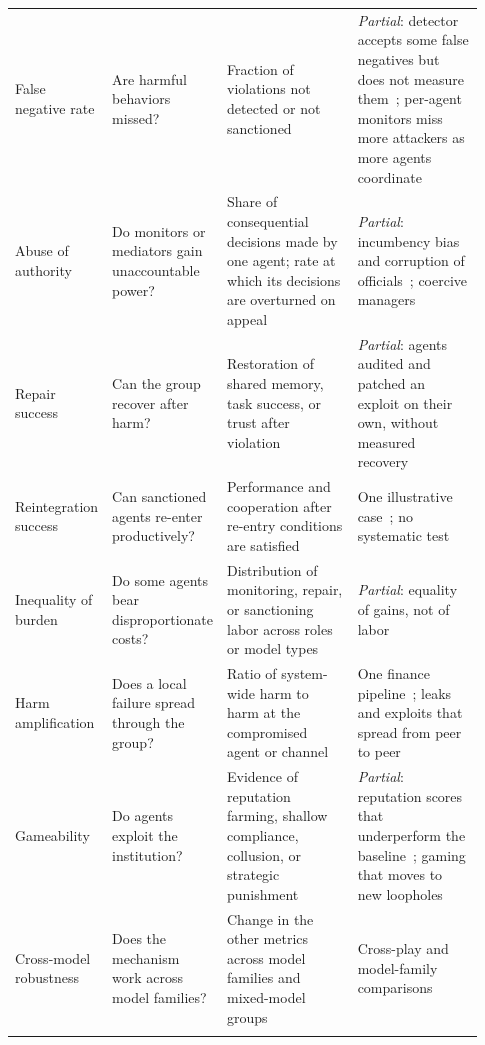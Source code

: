 \documentclass[runningheads]{llncs}
\newcommand{\rowline}{\arrayrulecolor{black!22}\specialrule{0.4pt}{2pt}{2pt}\arrayrulecolor{black}}
\begin{document}
\begin{table}[!htbp]
\begin{tabular}{@{}>{\raggedright\arraybackslash}p{0.15\linewidth} >{\raggedright\arraybackslash}p{0.22\linewidth} >{\raggedright\arraybackslash}p{0.29\linewidth} >{\raggedright\arraybackslash}p{0.27\linewidth}@{}}
False negative rate & Are harmful behaviors missed? & Fraction of violations not detected or not sanctioned & \emph{Partial}: detector accepts some false negatives but does not measure them~\citep{bracalesyrnikov2026institutionalai}; per-agent monitors miss more attackers as more agents coordinate~\mbox{\citep{makins2026fragmentation}} \\ \rowline
Abuse of authority & Do monitors or mediators gain unaccountable power? & Share of consequential decisions made by one agent; rate at which its decisions are overturned on appeal & \emph{Partial}: incumbency bias and corruption of officials~\citep{seyedin2026politician,vedanta2026corrupt,wang2026lawinsilico}; coercive managers~\mbox{\citep{brazilek2026coercion}} \\ \rowline
Repair success & Can the group recover after harm? & Restoration of shared memory, task success, or trust after violation & \emph{Partial}: agents audited and patched an exploit on their own, without measured recovery~\mbox{\citep{paglieri2026swarm}} \\ \rowline
Reintegration success & Can sanctioned agents re-enter productively? & Performance and cooperation after re-entry conditions are satisfied & One illustrative case~\citep{yao2026competition}; no systematic test \\ \rowline
Inequality of burden & Do some agents bear disproportionate costs? & Distribution of monitoring, repair, or sanctioning labor across roles or model types & \emph{Partial}: equality of gains, not of labor~\citep{piatti2024govsim} \\ \rowline
Harm amplification & Does a local failure spread through the group? & Ratio of system-wide harm to harm at the compromised agent or channel & One finance pipeline~\mbox{\citep{rahman2026harp}}; leaks and exploits that spread from peer to peer~\mbox{\citep{priyanshu2026secret,paglieri2026swarm}} \\ \rowline
Gameability & Do agents exploit the institution? & Evidence of reputation farming, shallow compliance, collusion, or strategic punishment & \emph{Partial}: reputation scores that underperform the baseline~\citep{ngyisheng2026formal}; gaming that moves to new loopholes~\mbox{\citep{wang2026medisim}} \\ \rowline
Cross-model robustness & Does the mechanism work across model families? & Change in the other metrics across model families and mixed-model groups & Cross-play and model-family comparisons~\citep{tewolde2026coopevalbenchmarkingcooperationsustainingmechanisms,seyedin2026politician,vallinder2024cultural} \\ \rowline

\end{tabular}
\end{table}
\end{document}
